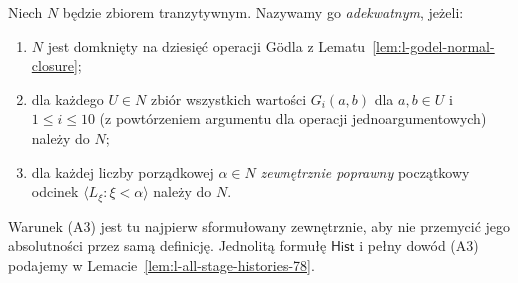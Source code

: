 \begin{definicja}
\label{def:l-adequacy-2026}
Niech $N$ będzie zbiorem tranzytywnym.
Nazywamy go \emph{adekwatnym}, jeżeli:
\begin{enumerate}[label=(A\arabic*)]
\item $N$ jest domknięty na dziesięć operacji
  Gödla z Lematu~\ref{lem:l-godel-normal-closure};
\item dla każdego $U\in N$ zbiór wszystkich
  wartości $G_i(a,b)$ dla $a,b\in U$ i
  $1\leq i\leq10$ (z powtórzeniem argumentu
  dla operacji jednoargumentowych) należy do $N$;
\item dla każdej liczby porządkowej $\alpha\in N$
  \emph{zewnętrznie poprawny} początkowy odcinek
  $\langle L_\xi:\xi<\alpha\rangle$ należy do $N$.
\end{enumerate}
Warunek (A3) jest tu najpierw sformułowany
zewnętrznie, aby nie przemycić jego absolutności
przez samą definicję. Jednolitą formułę
$\mathsf{Hist}$ i pełny dowód (A3) podajemy w
Lemacie~\ref{lem:l-all-stage-histories-78}.
\end{definicja}

